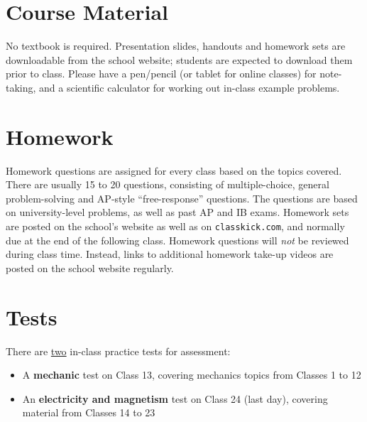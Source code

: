 \documentclass{../../oss-handout}
\begin{document}
\section{Course Material}
No textbook is required. Presentation slides, handouts and homework sets are
downloadable from the school website; students are expected to download them
prior to class. Please have a pen/pencil (or tablet for online classes) for
note-taking, and a scientific calculator for working out in-class example
problems.






\section{Homework}
Homework questions are assigned for every class based on the topics covered.
There are usually 15 to 20 questions, consisting of multiple-choice, general
problem-solving and AP-style ``free-response'' questions. The questions are
based on university-level problems, as well as past AP and IB exams. Homework
sets are posted on the school's website as well as on \texttt{classkick.com},
and normally due at the end of the following class. Homework questions will
\emph{not} be reviewed during class time. Instead, links to additional
homework take-up videos are posted on the school website regularly.


\section{Tests}
There are \underline{two} in-class practice tests for assessment:
\begin{itemize}[nosep,leftmargin=15pt]
\item A \textbf{mechanic} test on Class 13, covering mechanics topics from
  Classes 1 to 12
\item An \textbf{electricity and magnetism} test on Class 24 (last day),
  covering material from Classes 14 to 23
\end{itemize}
\end{document}
